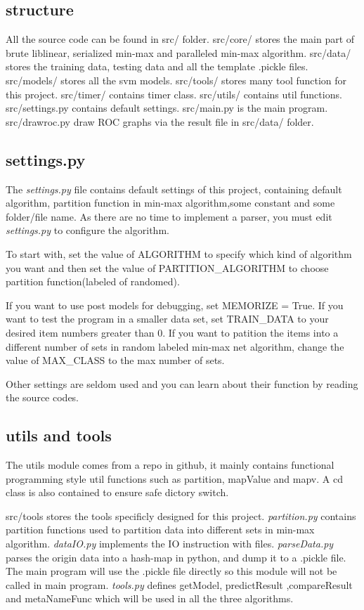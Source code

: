 \documentclass[11pt]{article}
\begin{document}
\subsection{structure}
\label{sec-3-2}
All the source code can be found in src/ folder. src/core/ stores the main part of
brute liblinear, serialized min-max and paralleled min-max algorithm. src/data/ stores
the training data, testing data and all the template .pickle files. src/models/ stores
all the svm models. src/tools/ stores many tool function for this project. src/timer/
contains timer class. src/utils/ contains util functions. src/settings.py contains
default settings. src/main.py is the main program. src/drawroc.py draw ROC graphs
via the result file in src/data/ folder.

\subsection{settings.py}
\label{sec-3-3}
The \emph{settings.py} file contains default settings of this project, containing default
algorithm, partition function in min-max algorithm,some constant and some folder/file name.
As there are no time to implement a parser, you must edit \emph{settings.py} to configure
the algorithm.

To start with, set the value of ALGORITHM
to specify which kind of algorithm you want and then set the value of PARTITION\_ALGORITHM to choose
partition function(labeled of randomed).

If you want to use post models for debugging, set MEMORIZE = True.
If you want to test the program in a smaller data set, set TRAIN\_DATA to your desired item numbers
greater than 0.
If you want to patition the items into a different number of sets in random labeled min-max net algorithm,
change the value of MAX\_CLASS to the max number of sets.

Other settings are seldom used and you can learn about their function by reading the source codes.

\subsection{utils and tools}
\label{sec-3-4}
The utils module comes from a repo in github, it mainly contains functional programming style
util functions such as partition, mapValue and mapv. A cd class is also contained to
ensure safe dictory switch.

src/tools stores the tools specificly designed for this project. \emph{partition.py} contains
partition functions used to partition data into different sets in min-max algorithm. \emph{dataIO.py}
implements the IO instruction with files. \emph{parseData.py} parses the origin data into a hash-map
in python, and dump it to a .pickle file. The main program will use the .pickle file directly
so this module will not be called in main program. \emph{tools.py} defines getModel, predictResult
,compareResult and metaNameFunc which will be used in all the three algorithms.
\end{document}
